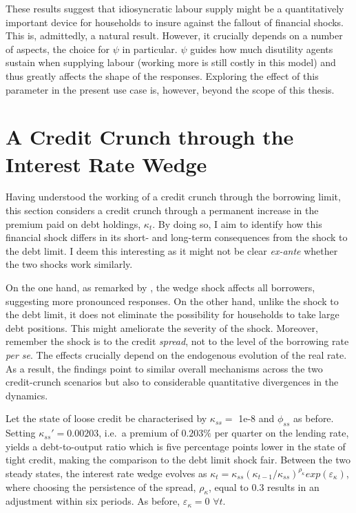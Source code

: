\documentclass[a4paper,12pt]{article} %
\numberwithin{equation}{section} %
\numberwithin{figure}{section}
\numberwithin{table}{section}
\begin{document}
These results suggest that idiosyncratic labour supply might be a quantitatively important device for households to insure against the fallout of financial shocks. This is, admittedly, a natural result. However, it crucially depends on a number of aspects, the choice for $\psi$ in particular. $\psi$ guides how much disutility agents sustain when supplying labour (working more is still costly in this model) and thus greatly affects the shape of the responses. Exploring the effect of this parameter in the present use case is, however, beyond the scope of this thesis.

\section{A Credit Crunch through the Interest Rate Wedge}
\label{sec:wedge}

Having understood the working of a credit crunch through the borrowing limit, this section considers a credit crunch through a permanent increase in the premium paid on debt holdings, $\kappa_t$. By doing so, I aim to identify how this financial shock differs in its short- and long-term consequences from the shock to the debt limit. I deem this interesting as it might not be clear \textit{ex-ante} whether the two shocks work similarly.

On the one hand, as remarked by \textcite{gl2017}, the wedge shock affects all borrowers, suggesting more pronounced responses. On the other hand, unlike the shock to the debt limit, it does not eliminate the possibility for households to take large debt positions. This might ameliorate the severity of the shock. Moreover, remember the shock is to the credit \textit{spread}, not to the level of the borrowing rate \textit{per se}. The effects crucially depend on the endogenous evolution of the real rate. As a result, the findings point to similar overall mechanisms across the two credit-crunch scenarios but also to considerable quantitative divergences in the dynamics. 

Let the state of loose credit be characterised by $\kappa_{ss} =$ 1e-8 and $\phi_{ss}$ as before. Setting $\kappa_{ss}' = 0.00203$, i.e.~a premium of $0.203\%$ per quarter on the lending rate, yields a debt-to-output ratio which is five percentage points lower in the state of tight credit, making the comparison to the debt limit shock fair. Between the two steady states, the interest rate wedge evolves as $\kappa_t = \kappa_{ss} ( \kappa_{t-1} / \kappa_{ss} )^{\rho_{\kappa}} exp(\varepsilon_{\kappa})$, where choosing the persistence of the spread, $\rho_{\kappa}$, equal to $0.3$ results in an adjustment within six periods. As before, $\varepsilon_{\kappa} = 0$ $\forall t$.
\end{document}
